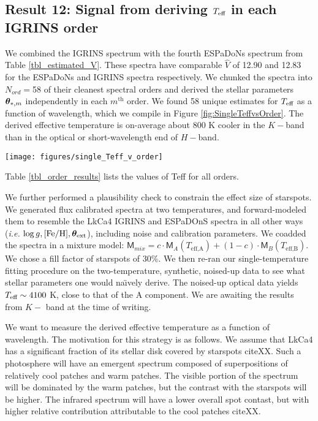 \documentclass[onecolumn]{emulateapj}%
\begin{document}
\subsection{Result 12: Signal from deriving $T_\textrm{eff}$ in each IGRINS order}

We combined the IGRINS spectrum with the fourth ESPaDoNs spectrum from Table \ref{tbl_estimated_V}.  These spectra have comparable $\hat V$ of 12.90 and 12.83 for the ESPaDoNs and IGRINS spectra respectively.  We chunked the spectra into $N_{ord}=$58 of their cleanest spectral orders and derived the stellar parameters ${\bm \theta}_{\ast,m}$ independently in each $m^{\mathrm{th}}$ order.  We found 58 unique estimates for $T_\textrm{eff}$ as a function of wavelength, which we compile in Figure \ref{fig:SingleTeffvsOrder}.  The derived effective temperature is on-average about 800 K cooler in the $K-$band than in the optical or short-wavelength end of $H-$band.

\begin{figure*}
	\centering
	\texttt{[image: figures/single\_Teff\_v\_order]}
	\caption{Effective temperature as derived from unique full spectrum fitting to each of 58 spectral orders in the optical through infrared portions of the spectrum assuming a single component photosphere.  }
	\label{fig:SingleTeffvsOrder}
\end{figure*}


Table \ref{tbl_order_results} lists the values of Teff for all orders.



We further performed a plausibility check to constrain the effect size of starspots.  We generated flux calibrated spectra at two temperatures, and forward-modeled them to resemble the LkCa4 IGRINS and ESPaDOnS spectra in all other ways (\emph{i.e.} $\log g, [{\rm Fe}/{\rm H}], {\bm \theta}_{\rm ext}$), including noise and calibration parameters.  We coadded the spectra in a mixture model:  $ \mathsf{M}_{mix} = c \cdot \mathsf{M}_A(T_\textrm{eff,A}) + (1-c) \cdot \mathsf{M}_B(T_\textrm{eff,B})$.  We chose a fill factor of starspots of 30\%.  We then re-ran our single-temperature fitting procedure on the two-temperature, synthetic, noised-up data to see what stellar parameters one would na\"{\i}vely derive.  The noised-up optical data yields $T_\textrm{eff} \sim 4100$ K, close to that of the A component.  We are awaiting the results from $K-$ band at the time of writing.


We want to measure the derived effective temperature as a function of wavelength.  The motivation for this strategy is as follows.  We assume that LkCa4 has a significant fraction of its stellar disk covered by starspots citeXX.  Such a photosphere will have an emergent spectrum composed of superpositions of relatively cool patches and warm patches.  The visible portion of the spectrum will be dominated by the warm patches, but the contrast with the starspots will be higher.  The infrared spectrum will have a lower overall spot contast, but with higher relative contribution attributable to the cool patches citeXX.  
\end{document}

